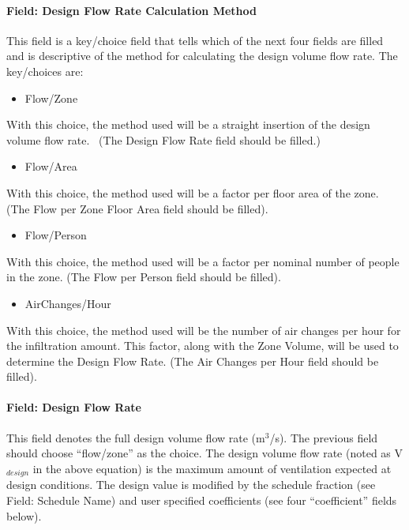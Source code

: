 \paragraph{Field: Design Flow Rate Calculation Method}\label{field-design-flow-rate-calculation-method-1}

This field is a key/choice field that tells which of the next four fields are filled and is descriptive of the method for calculating the design volume flow rate. The key/choices are:

\begin{itemize}
\tightlist
\item
  Flow/Zone
\end{itemize}

With this choice, the method used will be a straight insertion of the design volume flow rate.~ (The Design Flow Rate field should be filled.)

\begin{itemize}
\tightlist
\item
  Flow/Area
\end{itemize}

With this choice, the method used will be a factor per floor area of the zone. (The Flow per Zone Floor Area field should be filled).

\begin{itemize}
\tightlist
\item
  Flow/Person
\end{itemize}

With this choice, the method used will be a factor per nominal number of people in the zone. (The Flow per Person field should be filled).

\begin{itemize}
\tightlist
\item
  AirChanges/Hour
\end{itemize}

With this choice, the method used will be the number of air changes per hour for the infiltration amount. This factor, along with the Zone Volume, will be used to determine the Design Flow Rate. (The Air Changes per Hour field should be filled).

\paragraph{Field: Design Flow Rate}\label{field-design-flow-rate-1}

This field denotes the full design volume flow rate (m\(^{3}\)/s). The previous field should choose ``flow/zone'' as the choice. The design volume flow rate (noted as V\(_{design}\) in the above equation) is the maximum amount of ventilation expected at design conditions. The design value is modified by the schedule fraction (see Field: Schedule Name) and user specified coefficients (see four ``coefficient'' fields below).

